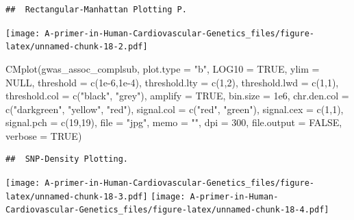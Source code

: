 \documentclass[
]{book}
\newenvironment{Shaded}{\begin{snugshade}}{\end{snugshade}}
\newcommand{\AttributeTok}[1]{\textcolor[rgb]{0.77,0.63,0.00}{#1}}
\newcommand{\ConstantTok}[1]{\textcolor[rgb]{0.00,0.00,0.00}{#1}}
\newcommand{\DecValTok}[1]{\textcolor[rgb]{0.00,0.00,0.81}{#1}}
\newcommand{\FloatTok}[1]{\textcolor[rgb]{0.00,0.00,0.81}{#1}}
\newcommand{\FunctionTok}[1]{\textcolor[rgb]{0.00,0.00,0.00}{#1}}
\newcommand{\NormalTok}[1]{#1}
\newcommand{\StringTok}[1]{\textcolor[rgb]{0.31,0.60,0.02}{#1}}
\begin{document}
\begin{verbatim}
##  Rectangular-Manhattan Plotting P.
\end{verbatim}

\texttt{[image: A-primer-in-Human-Cardiovascular-Genetics\_files/figure-latex/unnamed-chunk-18-2.pdf]}

\begin{Shaded}
\begin{Highlighting}[]
\FunctionTok{CMplot}\NormalTok{(gwas\_assoc\_complsub,}
       \AttributeTok{plot.type =} \StringTok{"b"}\NormalTok{, }\AttributeTok{LOG10 =} \ConstantTok{TRUE}\NormalTok{, }\AttributeTok{ylim =} \ConstantTok{NULL}\NormalTok{,}
       \AttributeTok{threshold =} \FunctionTok{c}\NormalTok{(}\FloatTok{1e{-}6}\NormalTok{,}\FloatTok{1e{-}4}\NormalTok{), }\AttributeTok{threshold.lty =} \FunctionTok{c}\NormalTok{(}\DecValTok{1}\NormalTok{,}\DecValTok{2}\NormalTok{), }\AttributeTok{threshold.lwd =} \FunctionTok{c}\NormalTok{(}\DecValTok{1}\NormalTok{,}\DecValTok{1}\NormalTok{), }\AttributeTok{threshold.col =} \FunctionTok{c}\NormalTok{(}\StringTok{"black"}\NormalTok{, }\StringTok{"grey"}\NormalTok{),}
       \AttributeTok{amplify =} \ConstantTok{TRUE}\NormalTok{,}
       \AttributeTok{bin.size =} \FloatTok{1e6}\NormalTok{, }\AttributeTok{chr.den.col =} \FunctionTok{c}\NormalTok{(}\StringTok{"darkgreen"}\NormalTok{, }\StringTok{"yellow"}\NormalTok{, }\StringTok{"red"}\NormalTok{),}
       \AttributeTok{signal.col =} \FunctionTok{c}\NormalTok{(}\StringTok{"red"}\NormalTok{, }\StringTok{"green"}\NormalTok{), }\AttributeTok{signal.cex =} \FunctionTok{c}\NormalTok{(}\DecValTok{1}\NormalTok{,}\DecValTok{1}\NormalTok{), }\AttributeTok{signal.pch =} \FunctionTok{c}\NormalTok{(}\DecValTok{19}\NormalTok{,}\DecValTok{19}\NormalTok{),}
       \AttributeTok{file =} \StringTok{"jpg"}\NormalTok{, }\AttributeTok{memo =} \StringTok{""}\NormalTok{, }\AttributeTok{dpi =} \DecValTok{300}\NormalTok{, }\AttributeTok{file.output =} \ConstantTok{FALSE}\NormalTok{, }\AttributeTok{verbose =} \ConstantTok{TRUE}\NormalTok{)}
\end{Highlighting}
\end{Shaded}

\begin{verbatim}
##  SNP-Density Plotting.
\end{verbatim}

\texttt{[image: A-primer-in-Human-Cardiovascular-Genetics\_files/figure-latex/unnamed-chunk-18-3.pdf]} \texttt{[image: A-primer-in-Human-Cardiovascular-Genetics\_files/figure-latex/unnamed-chunk-18-4.pdf]}
\end{document}
